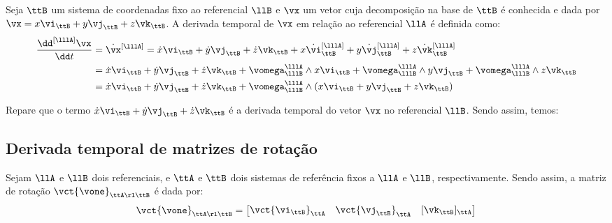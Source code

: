 \documentclass[]{politex}
\newcommand*\mybluebox[1]{%
\colorbox{myblue}{\hspace{1em}#1\hspace{1em}}}
\begin{document}
Seja $\ttB$ um sistema de coordenadas fixo ao referencial $\llB$ e $\vx$ um vetor cuja decomposição na base de $\ttB$ é conhecida e dada por $\vx = x \vi_{\ttB} + y \vj_{\ttB} + z \vk_{\ttB} $. A derivada temporal de $\vx$ em relação ao referencial $\llA$ é definida como:
\begin{equation}
\begin{split}
\frac{\dd^{[{\lllA}]} \vx }{\dd t} &= \dot{\vx}^{[\lllA]} = \dot{x} \vi_{\ttB} + \dot{y} \vj_{\ttB} + \dot{z} \vk_{\ttB} + x \dot{\vi}_{\ttB}^{[\lllA]} + y \dot{\vj}_{\ttB}^{[\lllA]} + z \dot{\vk}_{\ttB}^{[\lllA]} \\
 &= \dot{x} \vi_{\ttB} + \dot{y} \vj_{\ttB} + \dot{z} \vk_{\ttB} +  \vomega_{\lllB}^{\lllA} \wedge x \vi_{\ttB} +  \vomega_{\lllB}^{\lllA} \wedge y \vj_{\ttB} + \vomega_{\lllB}^{\lllA} \wedge z \vk_{\ttB} \\
 &= \dot{x} \vi_{\ttB} + \dot{y} \vj_{\ttB} + \dot{z} \vk_{\ttB} + \vomega_{\lllB}^{\lllA} \wedge (x \vi_{\ttB} + y \vj_{\ttB} + z \vk_{\ttB})
\end{split}
\end{equation}

Repare que o termo $\dot{x} \vi_{\ttB} + \dot{y} \vj_{\ttB} + \dot{z} \vk_{\ttB}$ é a derivada temporal do vetor $\vx$ no referencial $\llB$. Sendo assim, temos:

\subsection{Derivada temporal de matrizes de rotação}

Sejam $\llA$ e $\llB$ dois referenciais, e $\ttA$ e $\ttB$ dois sistemas de referência fixos a $\llA$ e $\llB$, respectivamente. Sendo assim, a matriz de rotação $\vct{\vone}_{\ttA \rl \ttB}$ é dada por:
\begin{equation} \label{eq:MatrizDeRotacao}
\vct{\vone}_{\ttA \rl \ttB} =
\begin{bmatrix}
\vct{\vi_\ttB}_\ttA & \vct{\vj_\ttB}_\ttA & [\vk_\ttB]_\ttA
\end{bmatrix}
\end{equation}
\end{document}
